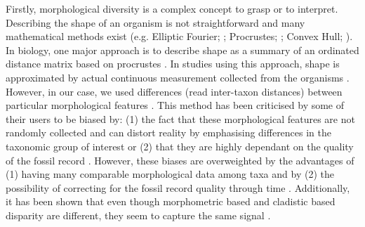 Firstly, morphological diversity is a complex concept to grasp or to interpret.
Describing the shape of an organism is not straightforward and many mathematical methods exist (e.g. Elliptic Fourier; \citealt{Fourier1982}; Procrustes; \citealt{JamesRohlf1993129}; Convex Hull; \citealt{ANDREW1979216}).
In biology, one major approach is to describe shape as a summary of an ordinated distance matrix based on procrustes \citep[i.e. a geometric morphometric approach][]{zelditch2012geometric}.
In studies using this approach, shape is approximated by actual continuous measurement collected from the organisms \citep[e.g.][]{friedmanexplosive2010,hopkinsdecoupling2013,finlay2015morphological}.
However, in our case, we used differences (read inter-taxon distances) between particular morphological features \citep[e.g.][]{foote1997evolution,Wills2001,Wesley-Hunt2005}.
This method has been criticised by some of their users to be biased by: (1) the fact that these morphological features are not randomly collected and can distort reality by emphasising differences in the taxonomic group of interest \citep{Hopkins24032015} or (2) that they are highly dependant on the quality of the fossil record \citep{Butler2012}.
However, these biases are overweighted by the advantages of (1) having many comparable morphological data among taxa \citep{Brusatte12092008} and by (2) the possibility of correcting for the fossil record quality through time \citep{Butler2012}.
Additionally, it has been shown that even though morphometric based and cladistic based disparity are different, they seem to capture the same signal \citep{foth2012different,hetherington2015cladistic}.

